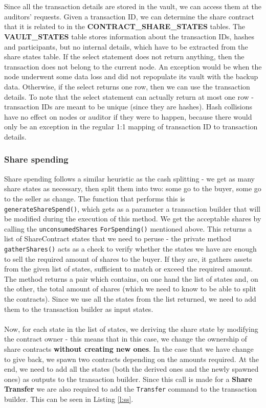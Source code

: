 \documentclass[12pt,twoside]{article}
\begin{document}
\\ \\
Since all the transaction details are stored in the vault, we can access them at the auditors' requests. Given a transaction ID, we can determine the share contract that it is related to in the \textbf{CONTRACT\_SHARE\_STATES} tables. The \textbf{VAULT\_STATES} table stores information about the transaction IDs, hashes and participants, but no internal details, which have to be extracted from the share states table. If the select statement does not return anything, then the transaction does not belong to the current node. An exception would be when the node underwent some data loss and did not repopulate its vault with the backup data. Otherwise, if the select returns one row, then we can use the transaction details. To note that the select statement can actually return at most one row - transaction IDs are meant to be unique (since they are hashes). Hash collisions have no effect on nodes or auditor if they were to happen, because there would only be an exception in the regular 1:1 mapping of transaction ID to transaction details. 
\subsubsection{Share spending}
\label{sub:spending}
Share spending follows a similar heuristic as the cash splitting - we get as many share states as necessary, then split them into two: some go to the buyer, some go to the seller as change. The function that performs this is \verb|generateShareSpend()|, which gets as a parameter a transaction builder that will be modified during the execution of this method. We get the acceptable shares by calling the \verb|unconsumedShares| \verb|ForSpending()| mentioned above. This returns a list of ShareContract states that we need to peruse - the private method \verb|gatherShares()| acts as a check to verify whether the states we have are enough to sell the required amount of shares to the buyer. If they are, it gathers assets from the given list of states, sufficient to match or exceed the required amount. The method returns a pair which contains, on one hand the list of states and, on the other, the total amount of shares (which we need to know to be able to split the contracts). Since we use all the states from the list returned, we need to add them to the transaction builder as input states.
\\ \\
Now, for each state in the list of states, we deriving the share state by modifying the contract owner - this means that in this case, we change the ownership of share contracts \textbf{without creating new ones}. In the case that we have change to give back, we spawn two contracts depending on the amounts required. At the end, we need to add all the states (both the derived ones and the newly spawned ones) as outputs to the transaction builder. Since this call is made for a \textbf{Share Transfer} we are also required to add the \verb|Transfer| command to the transaction builder. This can be seen in Listing \ref{l:ss}.

\end{document}
